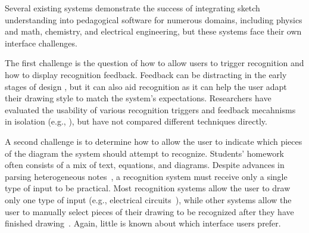 \documentclass{egpubl}
\begin{document}

Several existing systems demonstrate the success of integrating sketch
understanding into pedagogical software for numerous domains,
including physics and math\cite{LaViola2006Initial},
chemistry\cite{Tenneson2005ChemPad}, and electrical
engineering\cite{KaraStahovich04SimuSketch}, but these systems face
their own interface challenges.

% 


The first challenge is the question of how to allow users to trigger
recognition and how to display recognition feedback.  Feedback can be
distracting in the early stages of design \cite{Hong2002Sketch}, but
it can also aid recognition as it can help the user adapt their
drawing style to match the system's expectations.  Researchers have
evaluated the usability of various recognition triggers and feedback
mecahnisms in isolation (e.g.,
\cite{Alvarado2001Preserving,Newman2003Denim,LaViola2006Initial}), but
have not compared different techniques directly.

A second challenge is to determine how to allow the user to indicate
which pieces of the diagram the system should attempt to recognize.
Students' homework often consists of a mix of text, equations, and
diagrams. Despite advances in parsing heterogeneous
notes~\cite{Wang2006Parsing}, a recognition system must receive only a
single type of input to be practical.  Most recognition systems allow
the user to draw only one type of input (e.g., electrical
circuits~\cite{Gennari2005Combining}), while other systems allow the
user to manually select pieces of their drawing to be recognized after
they have finished drawing~\cite{LaViola2006Initial}.  Again, little
is known about which interface users prefer.
\end{document}
